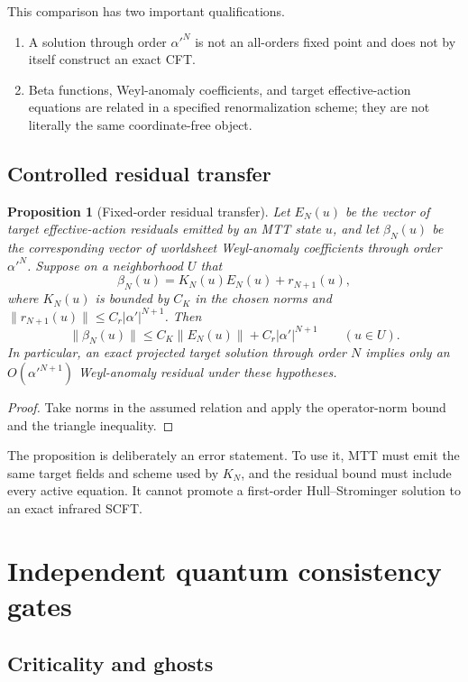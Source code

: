 \documentclass[11pt]{article}
\newtheorem{proposition}[theorem]{Proposition}
\theoremstyle{definition}
\theoremstyle{remark}
\begin{document}
This comparison has two important qualifications.
\begin{enumerate}[leftmargin=1.7em]
\item A solution through order \(\alpha'^N\) is not an all-orders fixed
      point and does not by itself construct an exact CFT.
\item Beta functions, Weyl-anomaly coefficients, and target effective-action
      equations are related in a specified renormalization scheme; they are
      not literally the same coordinate-free object.
\end{enumerate}

\subsection{Controlled residual transfer}

\begin{proposition}[Fixed-order residual transfer]
\label{prop:residual-transfer}
Let \(E_N(u)\) be the vector of target effective-action residuals emitted by
an MTT state \(u\), and let \(\beta_N(u)\) be the corresponding vector of
worldsheet Weyl-anomaly coefficients through order \(\alpha'^N\).  Suppose
on a neighborhood \(U\) that
\[
\beta_N(u)=K_N(u)E_N(u)+r_{N+1}(u),
\]
where \(K_N(u)\) is bounded by \(C_K\) in the chosen norms and
\(\|r_{N+1}(u)\|\le C_r|\alpha'|^{N+1}\).  Then
\[
\|\beta_N(u)\|
\le C_K\|E_N(u)\|+C_r|\alpha'|^{N+1}
\qquad (u\in U).
\]
In particular, an exact projected target solution through order \(N\)
implies only an \(O(\alpha'^{N+1})\) Weyl-anomaly residual under these
hypotheses.
\end{proposition}

\begin{proof}
Take norms in the assumed relation and apply the operator-norm bound and the
triangle inequality.
\end{proof}

The proposition is deliberately an error statement.  To use it, MTT must
emit the same target fields and scheme used by \(K_N\), and the residual
bound must include every active equation.  It cannot promote a first-order
Hull--Strominger solution to an exact infrared SCFT.

\section{Independent quantum consistency gates}
\label{sec:quantum-gates}

\subsection{Criticality and ghosts}
\end{document}
